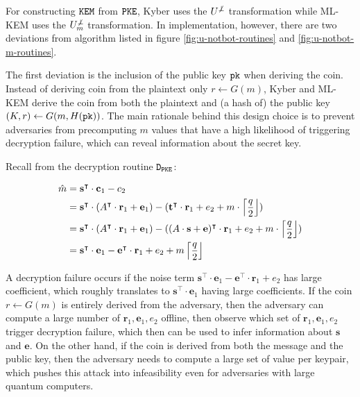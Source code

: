 \documentclass{article}
\begin{document}
For constructing $\texttt{KEM}$ from $\texttt{PKE}$, Kyber uses the $U^{\not\bot}$ transformation while ML-KEM uses the $U^{\not\bot}_m$ transformation. In implementation, however, there are two deviations from algorithm listed in figure \ref{fig:u-notbot-routines} and \ref{fig:u-notbot-m-routines}.

The first deviation is the inclusion of the public key $\texttt{pk}$ when deriving the coin. Instead of deriving coin from the plaintext only $r \leftarrow G(m)$, Kyber and ML-KEM derive the coin from both the plaintext and (a hash of) the public key $(K, r) \leftarrow G(m, H(\texttt{pk}))$. The main rationale \cite{bos2018crystals} behind this design choice is to prevent adversaries from precomputing $m$ values that have a high likelihood of triggering decryption failure, which can reveal information about the secret key.

Recall from the decryption routine $\texttt{D}_\texttt{PKE}$:

\begin{equation*}
    \begin{aligned}
        \hat{m} &= \mathbf{s}^\intercal \cdot \mathbf{c}_1 - c_2 \\
        &= \mathbf{s}^\intercal \cdot (
            A^\intercal \cdot \mathbf{r}_1 + \mathbf{e}_1
        ) - (
            \mathbf{t}^\intercal \cdot \mathbf{r}_1 + e_2 
            + m \cdot \left\lceil{\frac{q}{2}}\right\rfloor
        ) \\
        &= \mathbf{s}^\intercal \cdot (
            A^\intercal \cdot \mathbf{r}_1 + \mathbf{e}_1
        ) - (
            (
                A\cdot\mathbf{s} + \mathbf{e}
            )^\intercal \cdot \mathbf{r}_1 + e_2 
            + m \cdot \left\lceil{\frac{q}{2}}\right\rfloor
        ) \\
        &= \mathbf{s}^\intercal \cdot \mathbf{e}_1 
            - \mathbf{e}^\intercal \cdot \mathbf{r}_1 
            + e_2 + m \left\lceil{\frac{q}{2}}\right\rfloor
    \end{aligned}
\end{equation*}

A decryption failure occurs if the noise term $\mathbf{s}^\intercal\cdot\mathbf{e}_1 - \mathbf{e}^\intercal\cdot\mathbf{r}_1 + e_2$ has large coefficient, which roughly translates to $\mathbf{s}^\intercal\cdot\mathbf{e}_1$ having large coefficients. If the coin $r \leftarrow G(m)$ is entirely derived from the adversary, then the adversary can compute a large number of $\mathbf{r}_1, \mathbf{e}_1, e_2$ offline, then observe which set of $\mathbf{r}_1, \mathbf{e}_1, e_2$ trigger decryption failure, which then can be used to infer information about $\mathbf{s}$ and $\mathbf{e}$. On the other hand, if the coin is derived from both the message and the public key, then the adversary needs to compute a large set of value per keypair, which pushes this attack into infeasibility even for adversaries with large quantum computers.
\end{document}
